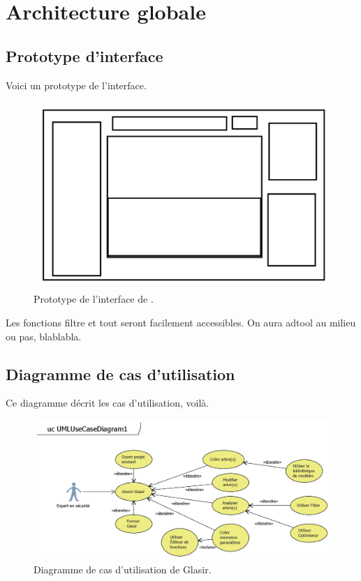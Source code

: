 \section{Architecture globale}
    \label{sec:archiGlobale}
    
    \subsection{Prototype d'interface}
    \label{sec:interface}
    
    Voici un prototype de l'interface.
    \begin{figure}[h!]
        \centering
        \includegraphics[height=0.4\textwidth]{figure/interface.png}
        \caption{Prototype de l'interface de \glasir{}.}
        \label{fig:glasir}
    \end{figure}
    
    Les fonctions filtre et tout seront facilement accessibles. On aura adtool au milieu ou pas, blablabla.
    
    \subsection{Diagramme de cas d'utilisation}
    \label{sec:casutil}
    	Ce diagramme décrit les cas d'utilisation, voilà.

    \begin{figure}[H]
        \centering
        \includegraphics[height=0.5\textwidth]{figure/UseCaseDiagram.png}
        \caption{Diagramme de cas d'utilisation de Glasir.}
        \label{fig:use_case}
    \end{figure}
    